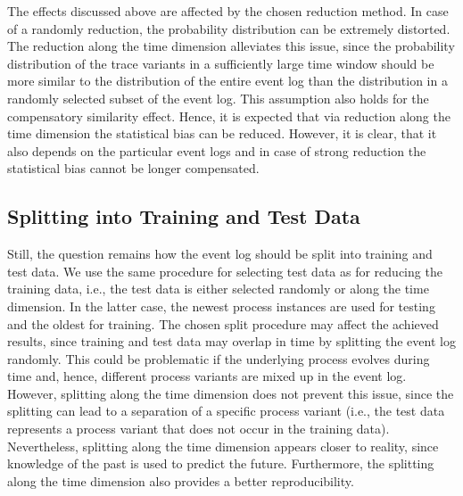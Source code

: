 \documentclass[runningheads]{llncs}
\begin{document}
The effects discussed above are affected by the chosen reduction method. In case of a randomly reduction, the probability distribution can be extremely distorted. The reduction along the time dimension alleviates this issue, since the probability distribution of the trace variants in a sufficiently large time window should be more similar to the distribution of the entire event log than the distribution in a randomly selected subset of the event log. This assumption also holds for the compensatory similarity effect. Hence, it is expected that via reduction along the time dimension the statistical bias can be reduced. However, it is clear, that it also depends on the particular event logs and in case of strong reduction the statistical bias cannot be longer compensated. 

\vspace{-5pt}
\subsection{Splitting into Training and Test Data}\label{Sec:Splitting-into-training-and-testdata}
\vspace{-5pt}
Still, the question remains how the event log should be split into training and test data. We use the same procedure for selecting test data as for reducing the training data, i.e., the test data is either selected randomly or along the time dimension. In the latter case, the newest process instances are used for testing and the oldest for training. The chosen split procedure may affect the achieved results, since training and test data may overlap in time by splitting the event log randomly. This could be problematic if the underlying process evolves during time and, hence, different process variants are mixed up in the event log. However, splitting along the time dimension does not prevent this issue, since the splitting can lead to a separation of a specific process variant (i.e., the test data represents a process variant that does not occur in the training data). Nevertheless, splitting along the time dimension appears closer to reality, since knowledge of the past is used to predict the future. Furthermore, the splitting along the time dimension also provides a better reproducibility.

\vspace{-5pt}	
\end{document}
